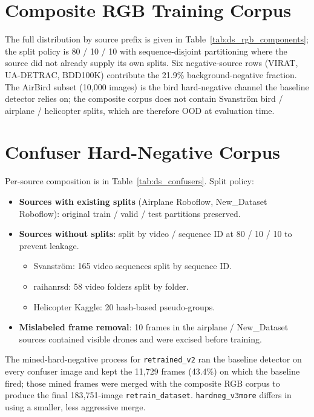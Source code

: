 \documentclass[12pt,a4paper,oneside,openright]{book}
\begin{document}
\section{Composite RGB Training Corpus}

The full distribution by source prefix is given in Table~\ref{tab:ds_rgb_components}; the split policy is 80 / 10 / 10 with sequence-disjoint partitioning where the source did not already supply its own splits. Six negative-source rows (VIRAT, UA-DETRAC, BDD100K) contribute the 21.9\% background-negative fraction. The AirBird subset (10{,}000 images) is the bird hard-negative channel the baseline detector relies on; the composite corpus does not contain Svanstr\"om bird / airplane / helicopter splits, which are therefore OOD at evaluation time.

\section{Confuser Hard-Negative Corpus}

Per-source composition is in Table~\ref{tab:ds_confusers}. Split policy:

\begin{itemize}
    \item \textbf{Sources with existing splits} (Airplane Roboflow, New\_Dataset Roboflow): original train / valid / test partitions preserved.
    \item \textbf{Sources without splits}: split by video / sequence ID at 80 / 10 / 10 to prevent leakage.
    \begin{itemize}
        \item Svanstr\"om: 165 video sequences split by sequence ID.
        \item raihanrsd: 58 video folders split by folder.
        \item Helicopter Kaggle: 20 hash-based pseudo-groups.
    \end{itemize}
    \item \textbf{Mislabeled frame removal}: 10 frames in the airplane / New\_Dataset sources contained visible drones and were excised before training.
\end{itemize}

\noindent The mined-hard-negative process for \texttt{retrained\_v2} ran the baseline detector on every confuser image and kept the 11{,}729 frames (43.4\%) on which the baseline fired; those mined frames were merged with the composite RGB corpus to produce the final 183{,}751-image \texttt{retrain\_dataset}. \texttt{hardneg\_v3more} differs in using a smaller, less aggressive merge.
\end{document}
